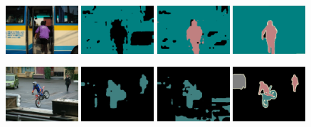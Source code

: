 \begin{figure}[tbhp!]
  {\includegraphics[width=0.24\textwidth]{figures/experiments/pascal/orgckpt/0080.jpg}}
  {\includegraphics[width=0.24\textwidth]{figures/experiments/pascal/orgckpt/0080.png}}
  {\includegraphics[width=0.24\textwidth]{figures/experiments/pascal/nonnoisybaseline/0080.png}}
  {\includegraphics[width=0.24\textwidth]{figures/experiments/pascal/gt/2007_002539.png}}
  
  {\includegraphics[width=0.24\textwidth]{figures/experiments/pascal/orgckpt/0086.jpg}}
  {\includegraphics[width=0.24\textwidth]{figures/experiments/pascal/orgckpt/0086.png}}
  {\includegraphics[width=0.24\textwidth]{figures/experiments/pascal/nonnoisybaseline/0086.png}}
  {\includegraphics[width=0.24\textwidth]{figures/experiments/pascal/gt/2007_002643.png}}
  

\end{figure}
